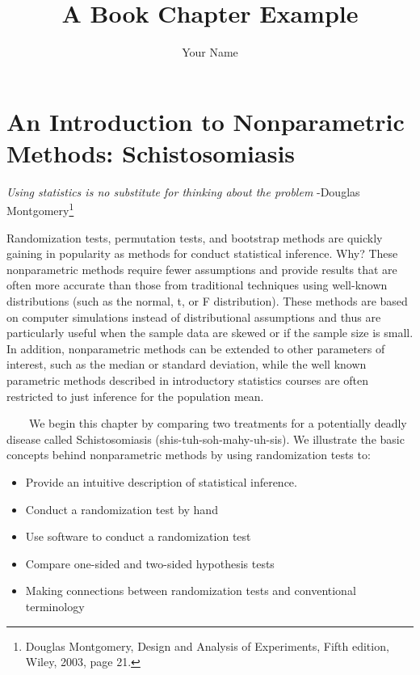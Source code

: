 \documentclass[
]{report}
\title{A Book Chapter Example}
\author{Your Name}
\date{}
\providecommand{\tightlist}{%
  \setlength{\itemsep}{0pt}\setlength{\parskip}{0pt}}
\begin{document}
\maketitle

{
\setcounter{tocdepth}{1}
\tableofcontents
}
\chapter{An Introduction to Nonparametric Methods: Schistosomiasis}\label{an-introduction-to-nonparametric-methods-schistosomiasis}

\emph{Using statistics is no substitute for thinking about the problem}
-Douglas Montgomery\footnote{Douglas Montgomery, Design and Analysis of Experiments, Fifth edition, Wiley, 2003, page 21.}

Randomization tests, permutation tests, and bootstrap methods are quickly gaining in popularity as methods for conduct statistical inference. Why? These nonparametric methods require fewer assumptions and provide results that are often more accurate than those from traditional techniques using well-known distributions (such as the normal, t, or F distribution). These methods are based on computer simulations instead of distributional assumptions and thus are particularly useful when the sample data are skewed or if the sample size is small. In addition, nonparametric methods can be extended to other parameters of interest, such as the median or standard deviation, while the well known parametric methods described in introductory statistics courses are often restricted to just inference for the population mean.

~~~~We begin this chapter by comparing two treatments for a potentially deadly disease called Schistosomiasis (shis-tuh-soh-mahy-uh-sis). We illustrate the basic concepts behind nonparametric methods by using randomization tests to:

\begin{itemize}
\tightlist
\item
  Provide an intuitive description of statistical inference.
\item
  Conduct a randomization test by hand
\item
  Use software to conduct a randomization test
\item
  Compare one-sided and two-sided hypothesis tests
\item
  Making connections between randomization tests and conventional terminology
\end{itemize}
\end{document}
